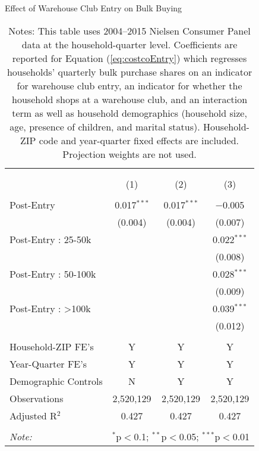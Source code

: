 \begin{table}[!htbp] \centering
  \caption{Effect of Warehouse Club Entry on Bulk Buying}
  \label{tab:costcoEntryDD}
\begin{tabular}{@{\extracolsep{5pt}}lccc}
\\[-1.8ex]\hline
\hline \\[-1.8ex]
\\[-1.8ex] & (1) & (2) & (3)\\
\hline \\[-1.8ex]
 Post-Entry & 0.017$^{***}$ & 0.017$^{***}$ & $-$0.005 \\
  & (0.004) & (0.004) & (0.007) \\
  Post-Entry : 25-50k &  &  & 0.022$^{***}$ \\
  &  &  & (0.008) \\
  Post-Entry : 50-100k &  &  & 0.028$^{***}$ \\
  &  &  & (0.009) \\
  Post-Entry : >100k &  &  & 0.039$^{***}$ \\
  &  &  & (0.012) \\
 \hline \\[-1.8ex]
Household-ZIP FE's & Y & Y & Y \\
Year-Quarter FE's & Y & Y & Y \\
Demographic Controls & N & Y & Y \\
Observations & 2,520,129 & 2,520,129 & 2,520,129 \\
Adjusted R$^{2}$ & 0.427 & 0.427 & 0.427 \\
\hline
\hline \\[-1.8ex]
\textit{Note:}  & \multicolumn{3}{l}{$^{*}$p$<$0.1; $^{**}$p$<$0.05; $^{***}$p$<$0.01} \\
\end{tabular}
\caption*{Notes: This table uses 2004--2015 Nielsen Consumer Panel data at the household-quarter level. Coefficients are reported for Equation (\ref{eq:costcoEntry}) which regresses households' quarterly bulk purchase shares on an indicator for warehouse club entry, an indicator for whether the household shops at a warehouse club, and an interaction term as well as household demographics (household size, age, presence of children, and marital status). Household-ZIP code and year-quarter fixed effects are included. Projection weights are not used.}
\end{table}
